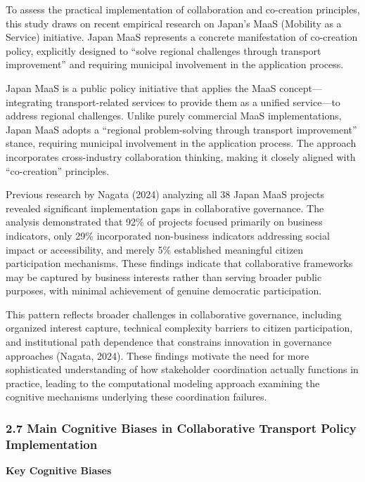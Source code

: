 To assess the practical implementation of collaboration and co-creation
principles, this study draws on recent empirical research on Japan's
MaaS (Mobility as a Service) initiative. Japan MaaS represents a
concrete manifestation of co-creation policy, explicitly designed to
``solve regional challenges through transport improvement'' and
requiring municipal involvement in the application process.

Japan MaaS is a public policy initiative that applies the MaaS
concept---integrating transport-related services to provide them as a
unified service---to address regional challenges. Unlike purely
commercial MaaS implementations, Japan MaaS adopts a ``regional
problem-solving through transport improvement'' stance, requiring
municipal involvement in the application process. The approach
incorporates cross-industry collaboration thinking, making it closely
aligned with ``co-creation'' principles.

Previous research by Nagata (2024) analyzing all 38 Japan MaaS projects
revealed significant implementation gaps in collaborative governance.
The analysis demonstrated that 92\% of projects focused primarily on
business indicators, only 29\% incorporated non-business indicators
addressing social impact or accessibility, and merely 5\% established
meaningful citizen participation mechanisms. These findings indicate
that collaborative frameworks may be captured by business interests
rather than serving broader public purposes, with minimal achievement of
genuine democratic participation.

This pattern reflects broader challenges in collaborative governance,
including organized interest capture, technical complexity barriers to
citizen participation, and institutional path dependence that constrains
innovation in governance approaches (Nagata, 2024). These findings
motivate the need for more sophisticated understanding of how
stakeholder coordination actually functions in practice, leading to the
computational modeling approach examining the cognitive mechanisms
underlying these coordination failures.

\subsubsection{2.7 Main Cognitive Biases in Collaborative Transport
Policy
Implementation}\label{main-cognitive-biases-in-collaborative-transport-policy-implementation}

\textbf{Key Cognitive Biases}

